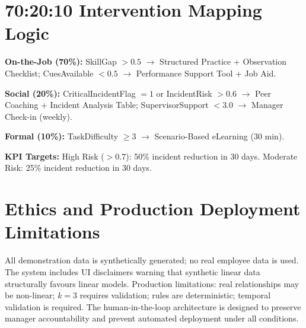 \documentclass[11pt,a4paper]{article}
\begin{document}
\section{70:20:10 Intervention Mapping Logic}
\label{app:interventions}

\textbf{On-the-Job (70\%):} SkillGap $>0.5$ $\rightarrow$ Structured Practice + Observation Checklist; CuesAvailable $<0.5$ $\rightarrow$ Performance Support Tool + Job Aid.

\textbf{Social (20\%):} CriticalIncidentFlag $=1$ or IncidentRisk $>0.6$ $\rightarrow$ Peer Coaching + Incident Analysis Table; SupervisorSupport $<3.0$ $\rightarrow$ Manager Check-in (weekly).

\textbf{Formal (10\%):} TaskDifficulty $\geq 3$ $\rightarrow$ Scenario-Based eLearning (30 min).

\textbf{KPI Targets:} High Risk ($>0.7$): 50\% incident reduction in 30 days. Moderate Risk: 25\% incident reduction in 30 days.

\section{Ethics and Production Deployment Limitations}
\label{app:ethics}

All demonstration data is synthetically generated; no real employee data is used. The system includes UI disclaimers warning that synthetic linear data structurally favours linear models. Production limitations: real relationships may be non-linear; $k=3$ requires validation; rules are deterministic; temporal validation is required. The human-in-the-loop architecture is designed to preserve manager accountability and prevent automated deployment under all conditions.
\end{document}
